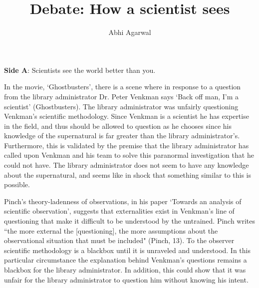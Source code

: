 \documentclass[11pt, oneside]{article}
\title{Debate: How a scientist sees\vspace{-0.4cm}}
\author{Abhi Agarwal\vspace{-1cm}}
\date{}
\begin{document}
\maketitle



\noindent \textbf{Side A}: Scientists see the world better than you.

\par In the movie, `Ghostbusters', there is a scene where in response to a question from the library administrator Dr. Peter Venkman says `Back off man, I'm a scientist' (Ghostbusters). The library administrator was unfairly questioning Venkman's scientific methodology. Since Venkman is a scientist he has expertise in the field, and thus should be allowed to question as he chooses since his knowledge of the supernatural is far greater than the library administrator's. Furthermore, this is validated by the premise that the library administrator has called upon Venkman and his team to solve this paranormal investigation that he could not have. The library administrator does not seem to have any knowledge about the supernatural, and seems like in shock that something similar to this is possible.


\par Pinch's theory-ladenness of observations, in his paper `Towards an analysis of scientific observation', suggests that externalities exist in Venkman's line of questioning that make it difficult to be understood by the untrained. Pinch writes ``the more external the [questioning], the more assumptions about the observational situation that must be included" (Pinch, 13). To the observer scientific methodology is a blackbox until it is unraveled and understood. In this particular circumstance the explanation behind Venkman's questions remains a blackbox for the library administrator. In addition, this could show that it was unfair for the library administrator to question him without knowing his intent.
\end{document}
